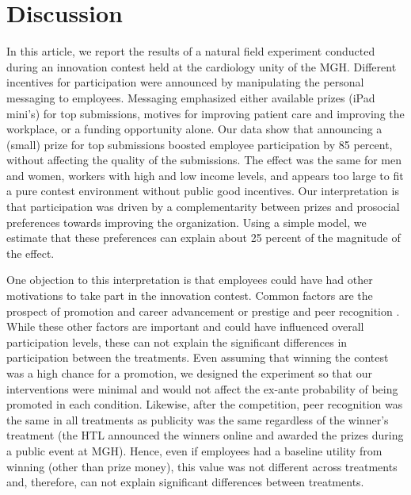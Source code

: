 \documentclass[11pt, titlepage]{article}
\begin{document}
\section{Discussion}\label{discussion}

In this article, we report the results of a natural field experiment
conducted during an innovation contest held at the cardiology unity of
the MGH. Different incentives for participation were announced by
manipulating the personal messaging to employees. Messaging emphasized
either available prizes (iPad mini's) for top submissions, motives for
improving patient care and improving the workplace, or a funding
opportunity alone. Our data show that announcing a (small) prize for top
submissions boosted employee participation by 85 percent, without
affecting the quality of the submissions. The effect was the same for
men and women, workers with high and low income levels, and appears too
large to fit a pure contest environment without public good incentives.
Our interpretation is that participation was driven by a complementarity
between prizes and prosocial preferences towards improving the
organization. Using a simple model, we estimate that these preferences
can explain about 25 percent of the magnitude of the effect.

One objection to this interpretation is that employees could have had
other motivations to take part in the innovation contest. Common factors
are the prospect of promotion and career advancement
\citep{baker1994internal, gibbs1995incentive} or prestige and peer
recognition \citep{kosfeld2011getting, blanes2011tournaments}. While
these other factors are important and could have influenced overall
participation levels, these can not explain the significant differences
in participation between the treatments. Even assuming that winning the
contest was a high chance for a promotion, we designed the experiment so
that our interventions were minimal and would not affect the ex-ante
probability of being promoted in each condition. Likewise, after the
competition, peer recognition was the same in all treatments as
publicity was the same regardless of the winner's treatment (the HTL
announced the winners online and awarded the prizes during a public
event at MGH). Hence, even if employees had a baseline utility from
winning (other than prize money), this value was not different across
treatments and, therefore, can not explain significant differences
between treatments.
\end{document}
